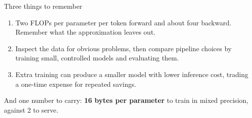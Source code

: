 \documentclass[aspectratio=169,10pt]{beamer}
\begin{document}
\begin{frame}{Three things to remember}
  \begin{enumerate}
    \item {} Two FLOPs per parameter per token forward and about four
      backward. Remember what the approximation leaves out.
      \vspace{0.6em}
    \item {} Inspect the data
      for obvious problems, then compare pipeline choices by training small,
      controlled models and evaluating them.
      \vspace{0.6em}
    \item {}
      Extra training can produce a smaller model with lower inference cost,
      trading a one-time expense for repeated savings.
  \end{enumerate}
  \vfill
  \small
  And one number to carry: \textbf{16 bytes per parameter} to train in mixed
  precision, against 2 to serve.
\end{frame}
\end{document}
